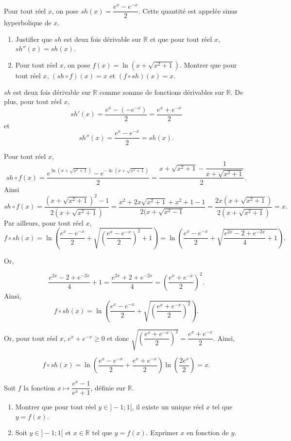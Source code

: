 \documentclass[11pt,fleqn, openany]{book} %
\begin{document}
\begin{exercise}[topic=log01]
Pour tout réel $x$, on pose $sh(x)=\dfrac{e^x-e^{-x}}{2}$. Cette quantité est appelée sinus hyperbolique de $x$.

\begin{enumerate}
\item Justifier que $sh$ est deux fois dérivable sur $\mathbb{R}$ et que pour tout réel $x$, $sh''(x)=sh(x)$.

\item Pour tout réel $x$, on pose $f(x)=\ln(x+\sqrt{x^2+1})$.  Montrer que pour tout réel $x$, $(sh\circ f) (x)=x$ et $(f \circ sh) (x) = x$.

\end{enumerate}\end{exercise}

\begin{solution}$sh$ est deux fois dérivable sur $\mathbb{R}$ comme somme de fonctions dérivables sur $\mathbb{R}$. De plus, pour tout réel $x$,
\[sh'(x)=\dfrac{e^x-(-e^{-x})}{2}=\dfrac{e^x+e^{-x}}{2}\]
et
\[sh''(x)=\dfrac{e^x-e^{-x}}{2}=sh(x).\]

Pour tout  réel $x$, 
\[sh\circ f (x)=\dfrac{e^{\ln(x+\sqrt{x^2+1})}-e^{-\ln(x+\sqrt{x^2+1})}}{2}=\dfrac{x+\sqrt{x^2+1}-\dfrac{1}{x+\sqrt{x^2+1}}}{2}.\]
Ainsi
\[ sh\circ f (x)= \dfrac{(x+\sqrt{x^2+1})^2-1}{2(x+\sqrt{x^2+1})}=\dfrac{x^2+2x\sqrt{x^2+1}+x^2+1-1}{2(x+\sqrt{x^2-1}}=\dfrac{2x(x+\sqrt{x^2+1})}{2(x+\sqrt{x^2+1})}=x.\]
Par ailleurs, pour tout réel $x$,
\[ f \circ sh(x)= \ln\left( \dfrac{e^x-e^{-x}}{2}+\sqrt{\left(\dfrac{e^x-e^{-x}}{2}\right)^2+1}\right)=\ln\left( \dfrac{e^x-e^{-x}}{2}+\sqrt{\dfrac{e^{2x}-2+e^{-2x}}{4}+1}\right).\]

Or, 

\[\dfrac{e^{2x}-2+e^{-2x}}{4}+1=\dfrac{e^{2x}+2+e^{-2x}}{4}=\left(\dfrac{e^x+e^{-x}}{2}\right)^2.\]
Ainsi, 
\[f \circ sh(x) = \ln\left( \dfrac{e^x-e^{-x}}{2}+\sqrt{\left(\dfrac{e^x+e^{-x}}{2}\right)^2}\right).\]

Or, pour tout réel $x$, $e^x+e^{-x}\geqslant 0$ et donc $\sqrt{\left(\dfrac{e^x+e^{-x}}{2}\right)^2}=\dfrac{e^x+e^{-x}}{2}$. Ainsi, 

\[f \circ sh(x)=\ln\left( \dfrac{e^x-e^{-x}}{2}+\dfrac{e^x+e^{-x}}{2}\right)\ln\left(\dfrac{2e^x}{2}\right)=x.\]\end{solution}





\begin{exercise}[topic=log01]Soit $f$ la fonction $x\mapsto \dfrac{e^x-1}{e^x+1}$, définie sur $\mathbb{R}$.
\begin{enumerate}
\item Montrer que pour tout réel $y \in ]-1;1[$, il existe un unique réel $x$ tel que $y=f(x)$.
\item Soit $y\in ]-1;1[$ et $x\in\mathbb{R}$ tel que $y=f(x)$. Exprimer $x$ en fonction de $y$.
\end{enumerate}\end{exercise}
\end{document}
